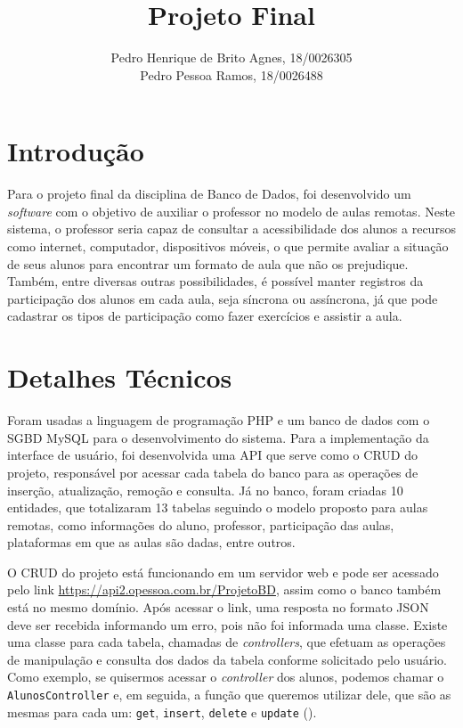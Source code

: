 \documentclass[12pt]{article}
\title{Projeto Final}
\author{Pedro Henrique de Brito Agnes, 18/0026305 \\
Pedro Pessoa Ramos, 18/0026488}
\date{}
\begin{document}
 
\maketitle

\section*{Introdução}
Para o projeto final da disciplina de Banco de Dados, foi desenvolvido um \textit{software} com o objetivo de auxiliar o professor no modelo de aulas remotas. Neste sistema, o professor seria capaz de consultar a acessibilidade dos alunos a recursos como internet, computador, dispositivos móveis, o que permite avaliar a situação de seus alunos para encontrar um formato de aula que não os prejudique. Também, entre diversas outras possibilidades, é possível manter registros da participação dos alunos em cada aula, seja síncrona ou assíncrona, já que pode cadastrar os tipos de participação como fazer exercícios e assistir a aula.

\section*{Detalhes Técnicos}
Foram usadas a linguagem de programação PHP e um banco de dados com o SGBD MySQL para o desenvolvimento do sistema. Para a implementação da interface de usuário, foi desenvolvida uma API que serve como o CRUD do projeto, responsável por acessar cada tabela do banco para as operações de inserção, atualização, remoção e consulta. Já no banco, foram criadas 10 entidades, que totalizaram 13 tabelas seguindo o modelo proposto para aulas remotas, como informações do aluno, professor, participação das aulas, plataformas em que as aulas são dadas, entre outros.

O CRUD do projeto está funcionando em um servidor web e pode ser acessado pelo link \url{https://api2.opessoa.com.br/ProjetoBD}, assim como o banco também está no mesmo domínio. Após acessar o link, uma resposta no formato JSON deve ser recebida informando um erro, pois não foi informada uma classe. Existe uma classe para cada tabela, chamadas de \textit{controllers}, que efetuam as operações de manipulação e consulta dos dados da tabela conforme solicitado pelo usuário. Como exemplo, se quisermos acessar o \textit{controller} dos alunos, podemos chamar o \texttt{AlunosController} e, em seguida, a função que queremos utilizar dele, que são as mesmas para cada um: \texttt{get}, \texttt{insert}, \texttt{delete} e \texttt{update} (\pageref{operacoes}).
\end{document}
